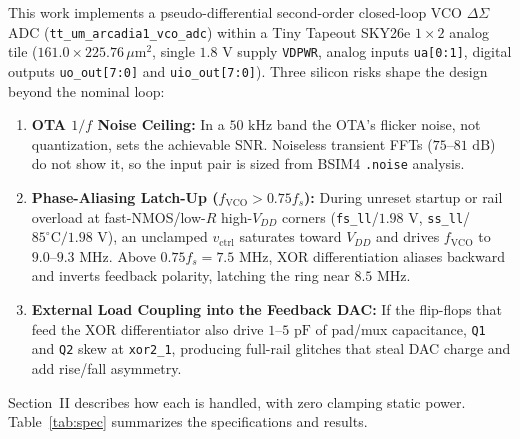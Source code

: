 \documentclass[10pt,twocolumn,letterpaper]{article}
\begin{document}
This work implements a pseudo-differential second-order closed-loop VCO $\Delta\Sigma$ ADC (\texttt{tt\_um\_arcadia1\_vco\_adc}) within a Tiny Tapeout SKY26e $1\times2$ analog tile ($161.0\times225.76\,\mu\text{m}^2$, single $1.8\text{ V}$ supply \texttt{VDPWR}, analog inputs \texttt{ua[0:1]}, digital outputs \texttt{uo\_out[7:0]} and \texttt{uio\_out[7:0]}). Three silicon risks shape the design beyond the nominal loop:
\begin{enumerate}[leftmargin=1.3em,itemsep=1pt,topsep=1.5pt]
  \item \textbf{OTA $1/f$ Noise Ceiling:} In a $50\text{ kHz}$ band the OTA's flicker noise, not quantization, sets the achievable SNR. Noiseless transient FFTs ($75$--$81\text{ dB}$) do not show it, so the input pair is sized from BSIM4 \texttt{.noise} analysis.
  \item \textbf{Phase-Aliasing Latch-Up ($f_{\text{VCO}}>0.75 f_s$):} During unreset startup or rail overload at fast-NMOS/low-$R$ high-$V_{DD}$ corners (\texttt{fs\_ll}/$1.98\text{ V}$, \texttt{ss\_ll}/$85^\circ\text{C}/1.98\text{ V}$), an unclamped $v_{\text{ctrl}}$ saturates toward $V_{DD}$ and drives $f_{\text{VCO}}$ to $9.0$--$9.3\text{ MHz}$. Above $0.75 f_s=7.5\text{ MHz}$, XOR differentiation aliases backward and inverts feedback polarity, latching the ring near $8.5\text{ MHz}$.
  \item \textbf{External Load Coupling into the Feedback DAC:} If the flip-flops that feed the XOR differentiator also drive $1$--$5\text{ pF}$ of pad/mux capacitance, \texttt{Q1} and \texttt{Q2} skew at \texttt{xor2\_1}, producing full-rail glitches that steal DAC charge and add rise/fall asymmetry.
\end{enumerate}

Section~II describes how each is handled, with zero clamping static power. Table~\ref{tab:spec} summarizes the specifications and results.
\end{document}
